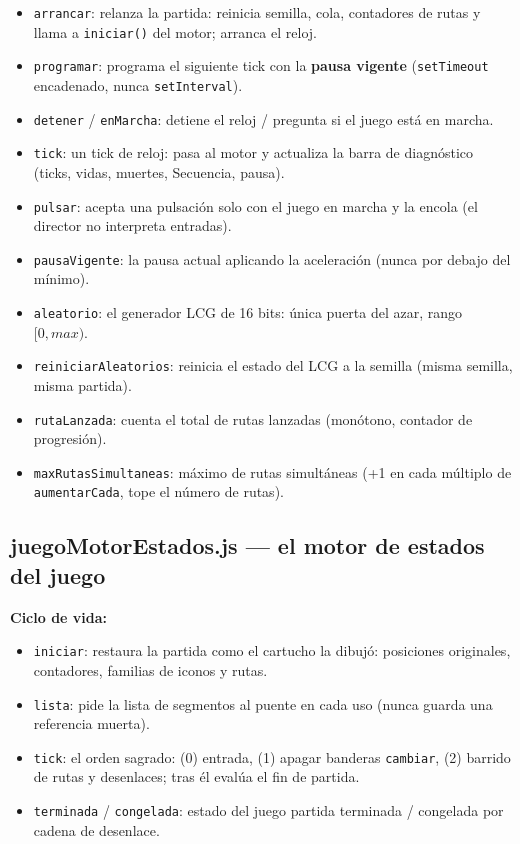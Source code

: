 \documentclass[../main.tex]{subfiles}
\begin{document}
	\begin{itemize}
		\item \texttt{arrancar}: relanza la partida: reinicia semilla, cola,
		contadores de rutas y llama a \texttt{iniciar()} del motor; arranca
		el reloj.
		\item \texttt{programar}: programa el siguiente tick con la
		\textbf{pausa vigente} (\texttt{setTimeout} encadenado, nunca
		\texttt{setInterval}).
		\item \texttt{detener} / \texttt{enMarcha}: detiene el reloj /
		pregunta si el juego está en marcha.
		\item \texttt{tick}: un tick de reloj: pasa al motor y actualiza la
		barra de diagnóstico (ticks, vidas, muertes, Secuencia, pausa).
		\item \texttt{pulsar}: acepta una pulsación solo con el juego en
		marcha y la encola (el director no interpreta entradas).
		\item \texttt{pausaVigente}: la pausa actual aplicando la
		aceleración (nunca por debajo del mínimo).
		\item \texttt{aleatorio}: el generador LCG de 16 bits: única puerta
		del azar, rango $[0, max)$.
		\item \texttt{reiniciarAleatorios}: reinicia el estado del LCG a la
		semilla (misma semilla, misma partida).
		\item \texttt{rutaLanzada}: cuenta el total de rutas lanzadas
		(monótono, contador de progresión).
		\item \texttt{maxRutasSimultaneas}: máximo de rutas simultáneas (+1
		en cada múltiplo de \texttt{aumentarCada}, tope el número de rutas).
	\end{itemize}
	
	\subsection*{juegoMotorEstados.js — el motor de estados del juego}
	
	\textbf{Ciclo de vida:}
	\begin{itemize}
		\item \texttt{iniciar}: restaura la partida como el cartucho la
		dibujó: posiciones originales, contadores, familias de iconos y
		rutas.
		\item \texttt{lista}: pide la lista de segmentos al puente en cada
		uso (nunca guarda una referencia muerta).
		\item \texttt{tick}: el orden sagrado: (0) entrada, (1) apagar
		banderas \texttt{cambiar}, (2) barrido de rutas y desenlaces; tras
		él evalúa el fin de partida.
		\item \texttt{terminada} / \texttt{congelada}: estado del juego
		partida terminada / congelada por cadena de desenlace.
	\end{itemize}
	
\end{document}
